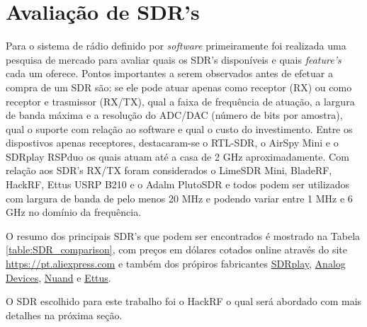 \documentclass[
  12pt,				%
  openright,			%
  twoside,			%
  a4paper,			%
  english,			%
  french,				%
  spanish,			%
  brazil,				%
  ]{abntex2}
\begin{document}
\section*{Avaliação de SDR's}

Para o sistema de rádio definido por \textit{software} primeiramente foi realizada uma pesquisa de mercado para avaliar quais os SDR's disponíveis e quais
\textit{feature's} cada um oferece. Pontos importantes a serem observados antes de efetuar a compra de um SDR são: se ele pode atuar apenas como receptor
(RX) ou como receptor e trasmissor (RX/TX), qual a faixa de frequência de atuação, a largura de banda máxima e a resolução do ADC/DAC (número de bits por amostra), qual o suporte
com relação ao software e qual o custo do investimento. Entre os dispostivos apenas receptores, destacaram-se o RTL-SDR, o AirSpy Mini e o SDRplay RSPduo
os quais atuam até a casa de 2 GHz aproximadamente. Com relação aos SDR's RX/TX foram considerados o LimeSDR Mini, BladeRF, HackRF, Ettus USRP B210 e o
Adalm PlutoSDR e todos podem ser utilizados com largura de banda de pelo menos 20 MHz e podendo variar entre 1 MHz e 6 GHz no domínio da frequência.

O resumo dos principais SDR's que podem ser encontrados é mostrado na Tabela \ref{table:SDR_comparison}, com preços em dólares cotados online através do site \href{https://pt.aliexpress.com}{https://pt.aliexpress.com}
e também dos própiros fabricantes \href{https://www.sdrplay.com/rspduo/}{SDRplay}, \href{https://www.analog.com/en/design-center/evaluation-hardware-and-software/evaluation-boards-kits/adalm-pluto.html}{Analog Devices},
\href{https://www.nuand.com/bladerf-1/}{Nuand} e \href{https://www.ettus.com/all-products/ub210-kit/}{Ettus}.

O SDR escolhido para este trabalho foi o HackRF o qual será abordado com mais detalhes na próxima seção.
\end{document}
